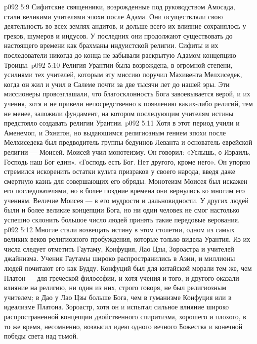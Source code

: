 \vs p092 5:9 \bibnobreakspace {} Сифитские священники, возрожденные под руководством Амосада, стали великими учителями эпохи после Адама. Они осуществляли свою деятельность во всех землях андитов, и дольше всего их влияние сохранялось у греков, шумеров и индусов. У последних они продолжают существовать до настоящего времени как брахманы индуистской религии. Сифиты и их последователи никогда до конца не забывали раскрытую Адамом концепцию Троицы.
\vs p092 5:10 \pc {}\bibnobreakspace {} Религия Урантии была возрождена, в огромной степени, усилиями тех учителей, которым эту миссию поручил Махивента Мелхиседек, когда он жил и учил в Салеме почти за две тысячи лет до нашей эры. Эти миссионеры провозглашали, что благосклонность Бога завоевывается верой, и их учения, хотя и не привели непосредственно к появлению каких\hyp{}либо религий, тем не менее, заложили фундамент, на котором последующим учителям истины предстояло создавать религии Урантии.
\vs p092 5:11 \pc {}\bibnobreakspace {} Хотя в этот период учили и Аменемоп, и Эхнатон, но выдающимся религиозным гением эпохи после Мелхиседека был предводитель группы бедуинов Леванта и основатель еврейской религии --- Моисей. Моисей учил монотеизму. Он говорил: «Услышь, о Израиль, Господь наш Бог един». «Господь есть Бог. Нет другого, кроме него». Он упорно стремился искоренить остатки культа призраков у своего народа, введя даже смертную казнь для совершающих его обряды. Монотеизм Моисея был искажен его последователями, но в более поздние времена они вернулись ко многим его учениям. Величие Моисея --- в его мудрости и дальновидности. У других людей были и более великие концепции Бога, но ни один человек не смог настолько успешно склонить большое число людей принять такие передовые верования.
\vs p092 5:12 \pc {}\bibnobreakspace {} Многие стали возвещать истину в этом столетии, одном из самых великих веков религиозного пробуждения, которые только видела Урантия. Из их числа следует отметить Гаутаму, Конфуция, Лао Цзы, Зороастра и учителей джайнизма. Учения Гаутамы широко распространились в Азии, и миллионы людей почитают его как Будду. Конфуций был для китайской морали тем же, чем Платон --- для греческой философии, и хотя учения и того, и другого оказали влияние на религию, ни один из них, строго говоря, не был религиозным учителем; в Дао у Лао Цзы больше Бога, чем в гуманизме Конфуция или в идеализме Платона. Зороастр, хотя он и испытал сильное влияние широко распространенной концепции двойственного спиритизма, хорошего и плохого, в то же время, несомненно, возвысил идею одного вечного Божества и конечной победы света над тьмой.
